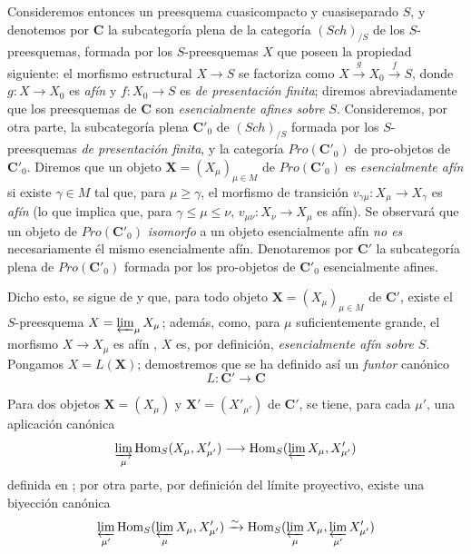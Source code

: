 \begin{env}[8.13.4]
\label{IV.8.13.4-fr}
Consideremos entonces un preesquema cuasicompacto y cuasiseparado $S$, y denotemos por $\boldsymbol{C}$ la subcategoría plena de la categoría $(\boldsymbol{\mathit{Sch}})_{/S}$ de los $S$-preesquemas, formada por los $S$-preesquemas $X$ que poseen la propiedad siguiente: el morfismo estructural $X\to S$ se factoriza como $X\xrightarrow{g}X_0\xrightarrow{f}S$, donde $g:X\to X_0$ es \emph{afín} y $f:X_0\to S$ es \emph{de presentación finita}; diremos abreviadamente que los preesquemas de $\boldsymbol{C}$ son \emph{esencialmente afines sobre $S$}.
Consideremos, por otra parte, la subcategoría plena $\boldsymbol{C}'_0$ de $(\boldsymbol{\mathit{Sch}})_{/S}$ formada por los $S$-preesquemas \emph{de presentación finita}, y la categoría $\boldsymbol{\mathit{Pro}}(\boldsymbol{C}'_0)$ de pro-objetos de $\boldsymbol{C}'_0$.
Diremos que un objeto $\mathbf X=(X_\mu)_{\mu\in M}$ de $\boldsymbol{\mathit{Pro}}(\boldsymbol{C}'_0)$ es \emph{esencialmente afín} si existe $\gamma\in M$ tal que, para $\mu\geqslant\gamma$, el morfismo de transición $v_{\gamma\mu}:X_\mu\to X_\gamma$ es \emph{afín} (lo que implica que, para $\gamma\leqslant\mu\leqslant\nu$, $v_{\mu\nu}:X_\nu\to X_\mu$ es afín).
Se observará que un objeto de $\boldsymbol{\mathit{Pro}}(\boldsymbol{C}'_0)$ \emph{isomorfo} a un objeto esencialmente afín \emph{no es} necesariamente él mismo esencialmente afín.
Denotaremos por $\boldsymbol{C}'$ la subcategoría plena de $\boldsymbol{\mathit{Pro}}(\boldsymbol{C}'_0)$ formada por los pro-objetos de $\boldsymbol{C}'_0$ esencialmente afines.

Dicho esto, se sigue de  y  que, para todo objeto $\mathbf X=(X_\mu)_{\mu\in M}$ de $\boldsymbol{C}'$, existe el $S$-preesquema $X=\varprojlim_\mu X_\mu$; además, como, para $\mu$ suficientemente grande, el morfismo $X\to X_\mu$ es afín , $X$ es, por definición, \emph{esencialmente afín sobre $S$}.
Pongamos $X=L(\mathbf X)$; demostremos que se ha definido así un \emph{funtor} canónico
\begin{equation}
\label{IV.8.13.4.1-fr}
L:\boldsymbol{C}'\longrightarrow\boldsymbol{C} \tag{8.13.4.1}
\end{equation}

Para dos objetos $\mathbf X=(X_\mu)$ y $\mathbf X'=(X'_{\mu'})$ de $\boldsymbol{C}'$, se tiene, para cada $\mu'$, una aplicación canónica
\[
\varinjlim_\mu\operatorname{Hom}_S(X_\mu,X'_{\mu'})
\longrightarrow
\operatorname{Hom}_S(\varprojlim X_\mu,X'_{\mu'})
\]
definida en ; por otra parte, por definición del límite proyectivo, existe una biyección canónica
\[
\varprojlim_{\mu'}
\operatorname{Hom}_S(\varprojlim_\mu X_\mu,X'_{\mu'})
\xrightarrow{\sim}
\operatorname{Hom}_S(\varprojlim_\mu X_\mu,
\varprojlim_{\mu'}X'_{\mu'})
\]


\end{env}
